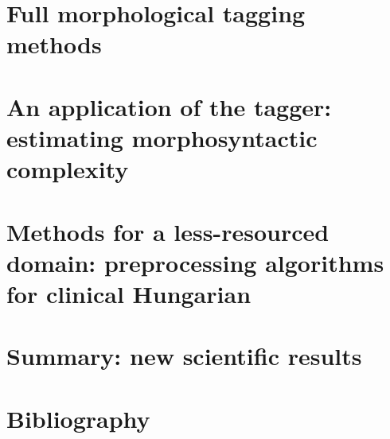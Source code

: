 \documentclass[a4paper,11pt,oneside,times,numbered,custommargin,custombib,PageStyleII]{Classes/PhDThesisPSnPDF}
\begin{document}

\chapter{Full morphological tagging methods}\label{chap:tagging}


\chapter{An application of the tagger: estimating morphosyntactic complexity}\label{chap:mlu}


\chapter{Methods for a less-resourced domain: preprocessing algorithms for clinical Hungarian}\label{chap:clin}


\chapter{Summary: new scientific results}\label{chap:sum}


\chapter*{Bibliography}
\protect\thispagestyle{empty}



\end{document}
